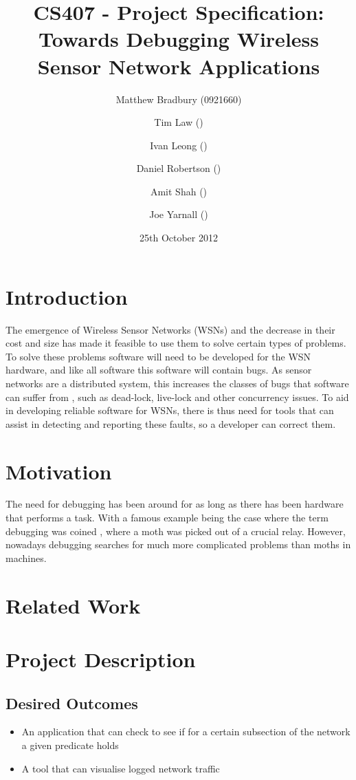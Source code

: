 \documentclass[a4paper]{article}
\title{CS407 - Project Specification:\\
Towards Debugging Wireless Sensor Network Applications}
\date{25th October 2012}
\author{
	Matthew Bradbury (0921660) \and
	Tim Law () \and
	Ivan Leong () \and
	Daniel Robertson () \and
	Amit Shah () \and
	Joe Yarnall ()
}
\begin{document}
\maketitle

\pagestyle{empty}
\thispagestyle{empty}

\newpage

\pagestyle{plain}
\setcounter{page}{1}

\tableofcontents
\clearpage


\section{Introduction}

The emergence of Wireless Sensor Networks (WSNs) and the decrease in their cost and size has made it feasible to use them to solve certain types of problems. To solve these problems software will need to be developed for the WSN hardware, and like all software this software will contain bugs. As sensor networks are a distributed system, this increases the classes of bugs that software can suffer from \cite{?}, such as dead-lock, live-lock and other concurrency issues. To aid in developing reliable software for WSNs, there is thus need for tools that can assist in detecting and reporting these faults, so a developer can correct them.

\section{Motivation}

The need for debugging has been around for as long as there has been hardware that performs a task. With a famous example being the case where the term debugging was coined \cite{?}, where a moth was picked out of a crucial relay. However, nowadays debugging searches for much more complicated problems than moths in machines.

\clearpage

\section{Related Work}

\clearpage

\section{Project Description}

\subsection{Desired Outcomes}
\begin{itemize}
	\item An application that can check to see if for a certain subsection of the network a given predicate holds
	\item A tool that can visualise logged network traffic
\end{itemize}
\end{document}
